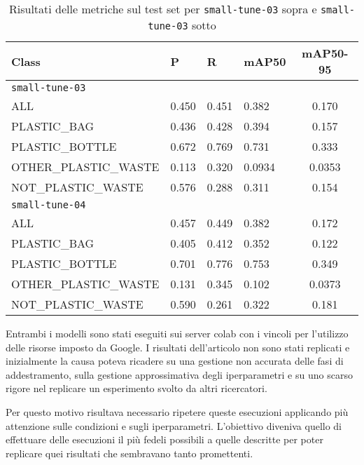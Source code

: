     \begin{table}[!htbp]
        \centering
        \begin{tabularx}{\textwidth}{lYYYc}
            \toprule
            Class & P & R & mAP50 & mAP50-95 \\
            \midrule
            \texttt{small-tune-03} \\
            \midrule
            ALL & 0.450 & 0.451 & 0.382 & 0.170 \\
            PLASTIC\_BAG & 0.436 & 0.428 & 0.394 & 0.157 \\
            PLASTIC\_BOTTLE & 0.672 & 0.769 & 0.731 & 0.333 \\
            OTHER\_PLASTIC\_WASTE & 0.113 & 0.320 & 0.0934 & 0.0353 \\
            NOT\_PLASTIC\_WASTE & 0.576 & 0.288 & 0.311 & 0.154 \\
            \midrule
            \texttt{small-tune-04} \\
            \midrule
            ALL & 0.457 & 0.449 & 0.382 & 0.172 \\
            PLASTIC\_BAG & 0.405 & 0.412 & 0.352 & 0.122 \\
            PLASTIC\_BOTTLE & 0.701 & 0.776 & 0.753 & 0.349 \\
            OTHER\_PLASTIC\_WASTE & 0.131 & 0.345 & 0.102 & 0.0373 \\
            NOT\_PLASTIC\_WASTE & 0.590 & 0.261 & 0.322 & 0.181 \\
            \bottomrule
        \end{tabularx}
        \caption{Risultati delle metriche sul test set per \texttt{small-tune-03} sopra e \texttt{small-tune-03} sotto}
        \label{table:v4-1}
    \end{table}

Entrambi i modelli sono stati eseguiti sui server colab con i vincoli per l'utilizzo delle risorse
imposto da Google. I risultati dell'articolo non sono stati replicati e inizialmente la causa
poteva ricadere su una gestione non accurata delle fasi di addestramento, sulla gestione approssimativa
degli iperparametri e su uno scarso rigore nel replicare un esperimento svolto da altri ricercatori.

Per questo motivo risultava necessario ripetere queste esecuzioni applicando più attenzione sulle 
condizioni e sugli iperparametri. L'obiettivo diveniva quello di effettuare delle esecuzioni il più fedeli
possibili a quelle descritte per poter replicare quei risultati che sembravano tanto promettenti.

